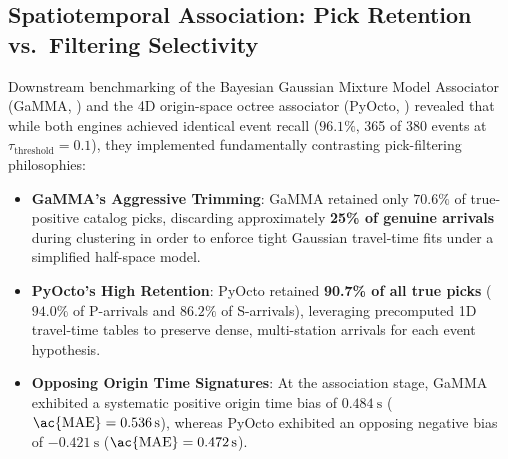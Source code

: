 \subsection{Spatiotemporal Association: Pick Retention
vs.\ Filtering Selectivity}
Downstream benchmarking of the Bayesian Gaussian Mixture Model
Associator (\ac{GaMMA}, \cite{GaMMA}) and the 4D origin-space octree
associator (\ac{PyOcto}, \cite{PyOcto}) revealed that while both
engines achieved identical event recall ($96.1\%$, 365 of 380 events
at $\tau_{\mathrm{threshold}} = 0.1$), they implemented
fundamentally contrasting pick-filtering philosophies:
\begin{itemize}
  \item \textbf{GaMMA's Aggressive Trimming}: GaMMA retained only
    $70.6\%$ of true-positive catalog picks, discarding
    approximately \textbf{25\% of genuine arrivals} during
    clustering in order to enforce tight Gaussian travel-time fits
    under a simplified half-space model.
  \item \textbf{\ac{PyOcto}'s High Retention}: \ac{PyOcto} retained
    \textbf{90.7\% of all true picks} ($94.0\%$ of P-arrivals and
    $86.2\%$ of S-arrivals), leveraging precomputed 1D travel-time
    tables to preserve dense, multi-station arrivals for each event hypothesis.
  \item \textbf{Opposing Origin Time Signatures}: At the association
    stage, \ac{GaMMA} exhibited a systematic positive origin time bias of
    $\qty{+0.484}{\second}$ ($\mathrm{\ac{MAE}} =
    \qty{0.536}{\second}$), whereas \ac{PyOcto} exhibited an opposing
    negative bias of $\qty{-0.421}{\second}$ ($\mathrm{\ac{MAE}} =
    \qty{0.472}{\second}$).
\end{itemize}

